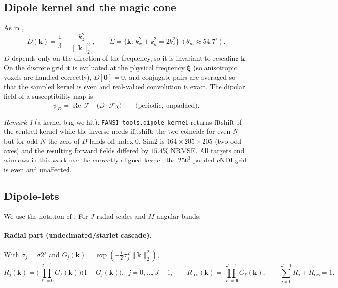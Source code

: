 \documentclass[11pt]{article}
\newcommand{\F}{\mathcal{F}}
\newcommand{\bk}{\bm{k}}
\newcommand{\bxi}{\bm{\xi}}
\newcommand{\norm}[1]{\lVert #1\rVert}
\newcommand{\Real}{\operatorname{Re}}
\newcommand{\code}[1]{\texttt{#1}}
\theoremstyle{remark}
\newtheorem{remark}{Remark}
\begin{document}
\subsection{Dipole kernel and the magic cone}
As in \cite{dipolelets},
\begin{equation}\label{eq:D}
D(\bk)=\frac13-\frac{k_z^2}{\norm{\bk}_2^2},\qquad \Sigma=\{\bk:\ k_x^2+k_y^2=2k_z^2\}\ (\theta_m\approx54.7^\circ).
\end{equation}
$D$ depends only on the direction of the frequency, so it is invariant to rescaling $\bk$. On the discrete grid it is evaluated at the physical frequency $\bxi$ (so anisotropic voxels are handled
correctly), $D[\mathbf 0]=0$, and conjugate pairs are averaged so that the sampled kernel is even and real-valued convolution is exact. The dipolar field of a susceptibility map is
\begin{equation}\label{eq:forward}
\psi_D=\Real\,\F^{-1}\!\big(D\cdot\F\chi\big)\qquad\text{(periodic, unpadded)}.
\end{equation}
\begin{remark}[a kernel bug we hit]
\code{FANSI\_tools.dipole\_kernel} returns $\mathrm{fftshift}$ of the centred kernel while the inverse needs $\mathrm{ifftshift}$; the two coincide for even $N$ but for odd $N$ the zero of $D$ lands off index $0$.
Sim2 is $164\times205\times205$ (two odd axes) and the resulting forward fields differed by $15.4\%$ NRMSE. All targets and windows in this work use the correctly aligned kernel; the $256^3$ padded eNDI grid is even and unaffected.
\end{remark}

\subsection{Dipole-lets}\label{sec:dipolelets}
We use the notation of \cite{dipolelets}. For $J$ radial scales and $M$ angular bands:

\paragraph{Radial part (undecimated/starlet cascade).} With $\sigma_j=\sigma2^{j}$ and $G_j(\bk)=\exp(-\tfrac12\sigma_j^2\norm{\bk}_2^2)$,
\begin{equation}\label{eq:radial}
R_j(\bk)=\Big(\prod_{\ell=0}^{j-1}G_\ell(\bk)\Big)\big(1-G_j(\bk)\big),\ \ j=0,\dots,J-1,\qquad R_{\mathrm{res}}(\bk)=\prod_{\ell=0}^{J-1}G_\ell(\bk),
\qquad \sum_{j=0}^{J-1}R_j+R_{\mathrm{res}}=1.
\end{equation}
\end{document}
